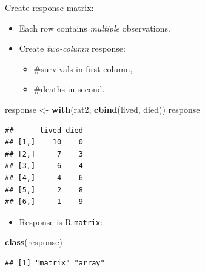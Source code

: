 \documentclass[
  ignorenonframetext,
]{beamer}
\newenvironment{Shaded}{\begin{snugshade}}{\end{snugshade}}
\newcommand{\KeywordTok}[1]{\textcolor[rgb]{0.13,0.29,0.53}{\textbf{#1}}}
\newcommand{\NormalTok}[1]{#1}
\newcommand{\StringTok}[1]{\textcolor[rgb]{0.31,0.60,0.02}{#1}}
\providecommand{\tightlist}{%
  \setlength{\itemsep}{0pt}\setlength{\parskip}{0pt}}
\begin{document}
\begin{frame}[fragile]{Create response matrix:}
\protect\hypertarget{create-response-matrix}{}

\begin{itemize}
\tightlist
\item
  Each row contains \emph{multiple} observations.
\item
  Create \emph{two-column} response:

  \begin{itemize}
  \tightlist
  \item
    \#survivals in first column,
  \item
    \#deaths in second.
  \end{itemize}
\end{itemize}

\footnotesize

\begin{Shaded}
\begin{Highlighting}[]
\NormalTok{response <-}\StringTok{ }\KeywordTok{with}\NormalTok{(rat2, }\KeywordTok{cbind}\NormalTok{(lived, died))}
\NormalTok{response}
\end{Highlighting}
\end{Shaded}

\begin{verbatim}
##      lived died
## [1,]    10    0
## [2,]     7    3
## [3,]     6    4
## [4,]     4    6
## [5,]     2    8
## [6,]     1    9
\end{verbatim}

\normalsize

\begin{itemize}
\tightlist
\item
  Response is R \texttt{matrix}:
\end{itemize}

\footnotesize

\begin{Shaded}
\begin{Highlighting}[]
\KeywordTok{class}\NormalTok{(response)}
\end{Highlighting}
\end{Shaded}

\begin{verbatim}
## [1] "matrix" "array"
\end{verbatim}

\normalsize

\end{frame}
\end{document}
